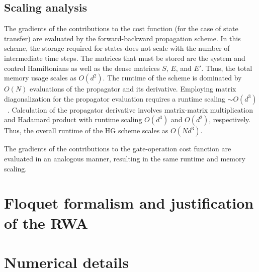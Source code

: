 \begin{appendices}
\section{Scaling analysis}
\label{sec:app_scaling}

The gradients of the contributions to the cost function (for the case of state transfer) are evaluated by the forward-backward propagation scheme. In this scheme, the storage required for states does not scale with the number of intermediate time steps. The matrices that must be stored are the system and control Hamiltonians as well as the dense matrices $S$, $E$, and $E'$. Thus, the total memory usage scales as $O(d^2)$. The runtime of the scheme is dominated by $O(N)$ evaluations of the propagator and its derivative. Employing matrix diagonalization for the propagator evaluation requires a runtime scaling $\sim O(d^3)$~\cite{matridiagcomppan1999complexity}. Calculation of the propagator derivative involves matrix-matrix multiplication and Hadamard product with runtime scaling $O(d^3)$ and $O(d^2)$, respectively. Thus, the overall runtime of the HG scheme scales as $O(Nd^3)$. 

The gradients of the contributions to the gate-operation cost function are evaluated in an analogous manner, resulting in the same runtime and memory scaling.

\chapter{Floquet formalism and justification of the RWA}
\label{app:floquet_formalism}


\chapter{Numerical details}
\label{app:numerical_details}



\end{appendices}
